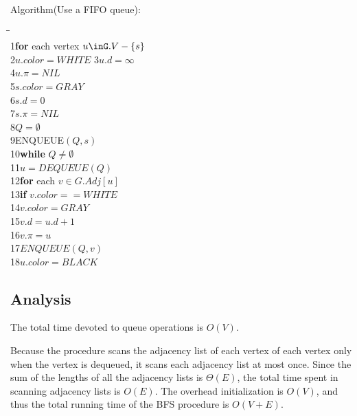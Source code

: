 \documentclass[a4paper,11pt]{book}
\begin{document}
Algorithm(Use a FIFO queue):
\begin{tabbing}
\hspace{.8cm}\=\hspace{.8cm}\=\hspace{.8cm}\=\\
1\>\textbf{for} each vertex $u\inG.V-\{s\}$\\ 
2\>\>$u.color = WHITE$
3\>\>$u.d = \infty$\\
4\>\>$u.\pi = NIL$\\
5\>$s.color = GRAY$\\
6\>$s.d = 0$\\
7\>$s.\pi = NIL$\\
8\>$Q = \emptyset$\\
9\>ENQUEUE$(Q,s)$\\
10\>\textbf{while} $Q\neq \emptyset$\\
11\>\>$u = DEQUEUE(Q)$\\
12\>\>\textbf{for} each $v\in G.Adj[u]$\\
13\>\>\>\textbf{if} $v.color == WHITE$\\
14\>\>\>\>$v.color = GRAY$\\
15\>\>\>\>$v.d = u.d+1$\\
16\>\>\>\>$v.\pi = u$\\
17\>\>\>\>$ENQUEUE(Q,v)$\\
18\>\>$u.color = BLACK$\\
\end{tabbing}
\subsection{Analysis}
The total time devoted to queue operations is $O(V)$. 

Because the procedure scans the adjacency list of each vertex of each vertex
only when the vertex is dequeued, it scans each adjacency list at most once.
Since the sum of the lengths of all the adjacency lists is $\Theta (E)$, the
total time spent in scanning adjacency lists is $O(E)$. The overhead
initialization is $O(V)$, and thus the total running time of the BFS procedure
is $O(V+E)$. 
\end{document}
